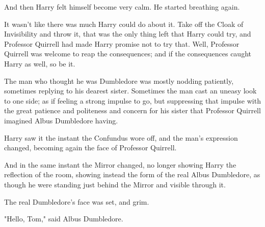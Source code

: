 And then Harry felt himself become very calm. He started breathing again.

It wasn't like there was much Harry could do about it. Take off the Cloak of 
Invisibility and throw it, that was the only thing left that Harry could try, 
and Professor Quirrell had made Harry promise not to try that. Well, Professor 
Quirrell was welcome to reap the consequences; and if the consequences caught 
Harry as well, so be it.

The man who thought he was Dumbledore was mostly nodding patiently, sometimes 
replying to his dearest sister. Sometimes the man cast an uneasy look to one 
side; as if feeling a strong impulse to go, but suppressing that impulse with 
the great patience and politeness and concern for his sister that Professor 
Quirrell imagined Albus Dumbledore having.

Harry saw it the instant the Confundus wore off, and the man's expression 
changed, becoming again the face of Professor Quirrell.

And in the same instant the Mirror changed, no longer showing Harry the 
reflection of the room, showing instead the form of the real Albus Dumbledore, 
as though he were standing just behind the Mirror and visible through it.

The real Dumbledore's face was set, and grim.

"Hello, Tom," said Albus Dumbledore.

